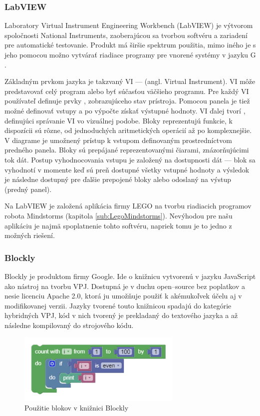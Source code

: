 \subsubsection{LabVIEW}
Laboratory Virtual Instrument Engineering Workbench (LabVIEW) je výtvorom spoločnosti National Instruments, zaoberajúcou sa tvorbou softvéru a zariadení pre automatické testovanie. Produkt má širšie spektrum použitia, mimo iného je s jeho pomocou možno vytvárať riadiace programy pre vnorené systémy v jazyku G \cite{LabVIEW}.

Základným prvkom jazyka je takzvaný VI ---  (angl. Virtual Instrument). VI môže predstavovať celý program alebo byť súčasťou väčšieho programu. Pre každý VI používateľ definuje prvky , zobrazujúceho stav prístroja. Pomocou panela je tiež možné definovať vstupy a po výpočte získať výstupné hodnoty. VI ďalej tvorí , definujúci správanie VI vo vizuálnej podobe. Bloky reprezentujú funkcie, k dispozícii sú rôzne, od jednoduchých aritmetických operácií až po komplexnejšie. V diagrame je umožnený prístup k vstupom definovaným prostredníctvom predného panela. Bloky sú prepájané  reprezentovanými čiarami, znázorňujúcimi tok dát. Postup vyhodnocovania vstupu je založený na dostupnosti dát --- blok sa vyhodnotí v momente keď sú preň dostupné všetky vstupné hodnoty a výsledok je následne dostupný pre ďalšie prepojené bloky alebo odoslaný na výstup (predný panel).

Na LabVIEW je založená aplikácia firmy LEGO na tvorbu riadiacich programov robota Mindstorms (kapitola \ref{sub:LegoMindstorms}). Nevýhodou pre našu aplikáciu je najmä spoplatnenie tohto softvéru, napriek tomu je to jedno z možných riešení.

\subsubsection{Blockly}
Blockly je produktom firmy Google. Ide o knižnicu vytvorenú v jazyku JavaScript ako nástroj na tvorbu VPJ. Dostupná je v duchu open--source bez poplatkov a nesie licenciu Apache 2.0, ktorá ju umožňuje použiť k akémukoľvek účelu aj v modifikovanej verzii. Jazyky tvorené touto knižnicou spadajú do kategórie hybridných VPJ, kód v nich tvorený je prekladaný do textového jazyka a až následne kompilovaný do strojového kódu.

\begin{figure}
\centerline{\includegraphics[width=0.7\textwidth]{images/blocky-example}}
\caption[Použitie blokov v knižnici Blockly]{Použitie blokov v knižnici Blockly}
\label{obr:blockly-example}
\end{figure}

